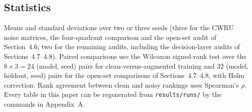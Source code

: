 \documentclass[11pt,a4paper]{article}
\begin{document}
\subsection{Statistics}
Means and standard deviations over two or three seeds (three for the CWRU noise matrices, the four-quadrant comparison and the open-set audit of Section~4.6; two for the remaining audits, including the decision-layer audits of Sections~4.7--4.8). Paired comparisons use the Wilcoxon signed-rank test over the $8\times3=24$ (model, seed) pairs for clean-versus-augmented training and 32 (model, holdout, seed) pairs for the open-set comparisons of Sections~4.7--4.8, with Holm correction. Rank agreement between clean and noisy rankings uses Spearman's $\rho$. Every table in this paper can be regenerated from \texttt{results/runs/} by the commands in Appendix~A.
\end{document}
